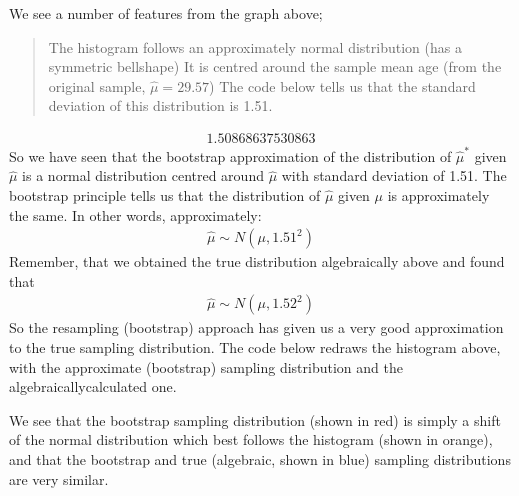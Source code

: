 \documentclass[letterpaper,10pt,english]{jupyterBook}
\begin{document}
\noindent{}

\sphinxAtStartPar
We see a number of features from the graph above;
\begin{quote}

\sphinxAtStartPar
\sphinxhyphen{} The histogram follows an approximately normal distribution (has a symmetric bell\sphinxhyphen{}shape)
\sphinxhyphen{} It is centred around the sample mean age (from the original sample, \(\hat{\mu} = 29.57\))
\sphinxhyphen{} The code below tells us that the standard deviation of this distribution is 1.51.
\end{quote}

\begin{sphinxVerbatim}[commandchars=\\\{\}]
\end{sphinxVerbatim}
\begin{equation*}
\begin{split}1.50868637530863\end{split}
\end{equation*}
\sphinxAtStartPar
So we have seen that the bootstrap approximation of the distribution of \(\hat{\mu}^*\) given \(\hat{\mu}\) is a normal distribution centred around \(\hat{\mu}\) with standard deviation of 1.51. The bootstrap principle tells us that the distribution of \(\hat{\mu}\) given \(\mu\) is approximately the same. In other words, approximately:
\begin{equation*}
\begin{split}
\hat{\mu} \sim N(\mu, 1.51^2)
\end{split}
\end{equation*}
\sphinxAtStartPar
Remember, that we obtained the true distribution algebraically above and found that
\begin{equation*}
\begin{split}
\hat{\mu} \sim N(\mu, 1.52^2)
\end{split}
\end{equation*}
\sphinxAtStartPar
So the resampling (bootstrap) approach has given us a very good approximation to the true sampling distribution. The code below redraws the histogram above, with the approximate (bootstrap) sampling distribution and the algebraically\sphinxhyphen{}calculated one.

\sphinxAtStartPar
We see that the bootstrap sampling distribution (shown in red) is simply a shift of the normal distribution which best follows the histogram (shown in orange), and that the bootstrap and true (algebraic, shown in blue) sampling distributions are very similar.
\end{document}
